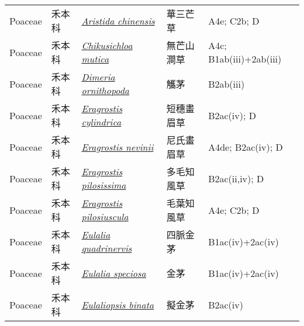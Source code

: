 {\begin{longtable}{p{2.5cm}p{2.5cm}p{4.5cm}p{2.5cm}p{3cm}}
    Poaceae & 禾本科 & \href{http://www.theplantlist.org/tpl1.1/search?q=Aristida+chinensis}{\textit{Aristida chinensis} } & 華三芒草 & A4e; C2b; D \index{Aristida@\textit{Aristida}!chinensis@\textit{chinensis}}  \index{華三芒草} \\
    Poaceae & 禾本科 & \href{http://www.theplantlist.org/tpl1.1/search?q=Chikusichloa+mutica}{\textit{Chikusichloa mutica} } & 無芒山澗草 & A4c; B1ab(iii)+2ab(iii) \index{Chikusichloa@\textit{Chikusichloa}!mutica@\textit{mutica}}  \index{無芒山澗草} \\
    Poaceae & 禾本科 & \href{http://www.theplantlist.org/tpl1.1/search?q=Dimeria+ornithopoda}{\textit{Dimeria ornithopoda} } & 觿茅 & B2ab(iii) \index{Dimeria@\textit{Dimeria}!ornithopoda@\textit{ornithopoda}}  \index{觿茅} \\
    Poaceae & 禾本科 & \href{http://www.theplantlist.org/tpl1.1/search?q=Eragrostis+cylindrica}{\textit{Eragrostis cylindrica} } & 短穗畫眉草 & B2ac(iv); D \index{Eragrostis@\textit{Eragrostis}!cylindrica@\textit{cylindrica}}  \index{短穗畫眉草} \\
    Poaceae & 禾本科 & \href{http://www.theplantlist.org/tpl1.1/search?q=Eragrostis+nevinii}{\textit{Eragrostis nevinii} } & 尼氏畫眉草 & A4de; B2ac(iv); D \index{Eragrostis@\textit{Eragrostis}!nevinii@\textit{nevinii}}  \index{尼氏畫眉草} \\
    Poaceae & 禾本科 & \href{http://www.theplantlist.org/tpl1.1/search?q=Eragrostis+pilosissima}{\textit{Eragrostis pilosissima} } & 多毛知風草 & B2ac(ii,iv); D \index{Eragrostis@\textit{Eragrostis}!pilosissima@\textit{pilosissima}}  \index{多毛知風草} \\
    Poaceae & 禾本科 & \href{http://www.theplantlist.org/tpl1.1/search?q=Eragrostis+pilosiuscula}{\textit{Eragrostis pilosiuscula} } & 毛葉知風草 & A4e; C2b; D \index{Eragrostis@\textit{Eragrostis}!pilosiuscula@\textit{pilosiuscula}}  \index{毛葉知風草} \\
    Poaceae & 禾本科 & \href{http://www.theplantlist.org/tpl1.1/search?q=Eulalia+quadrinervis}{\textit{Eulalia quadrinervis} } & 四脈金茅 & B1ac(iv)+2ac(iv) \index{Eulalia@\textit{Eulalia}!quadrinervis@\textit{quadrinervis}}  \index{四脈金茅} \\
    Poaceae & 禾本科 & \href{http://www.theplantlist.org/tpl1.1/search?q=Eulalia+speciosa}{\textit{Eulalia speciosa} } & 金茅 & B1ac(iv)+2ac(iv) \index{Eulalia@\textit{Eulalia}!speciosa@\textit{speciosa}}  \index{金茅} \\
    Poaceae & 禾本科 & \href{http://www.theplantlist.org/tpl1.1/search?q=Eulaliopsis+binata}{\textit{Eulaliopsis binata} } & 擬金茅 & B2ac(iv) \index{Eulaliopsis@\textit{Eulaliopsis}!binata@\textit{binata}}  \index{擬金茅} \\

\end{longtable}}
